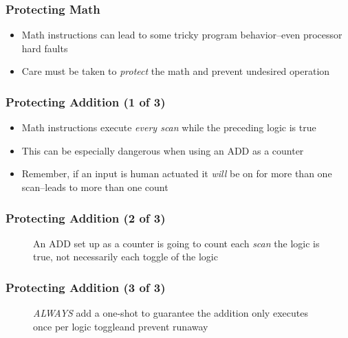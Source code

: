 \begin{frame}
    \frametitle{Protecting Math}

    \begin{itemize}
        \item Math instructions can lead to some tricky program behavior--even processor hard faults
        \item Care must be taken to \emph{protect} the math and prevent undesired operation
    \end{itemize}
\end{frame}

\begin{frame}
    \frametitle{Protecting Addition (1 of 3)}

    \begin{itemize}
        \item Math instructions execute \emph{every scan} while the preceding logic is true
        \item This can be especially dangerous when using an ADD as a counter
        \item Remember, if an input is human actuated it \emph{will} be on for more than one scan--leads to more than one count
    \end{itemize}
\end{frame}

\begin{frame}
    \frametitle{Protecting Addition (2 of 3)}

    \begin{figure}
        \centering
        \resizebox{0.625\linewidth}{!}{
            
        }

        \resizebox{0.625\linewidth}{!}{
            
        }

        \vspace{0.5em}
        {\footnotesize An ADD set up as a counter is going to count each \emph{scan} the logic is true, not necessarily each toggle of the logic\par}
    \end{figure}
\end{frame}

\begin{frame}
    \frametitle{Protecting Addition (3 of 3)}

    \begin{figure}
        \centering
        \resizebox{0.625\linewidth}{!}{
            
        }

        \resizebox{0.625\linewidth}{!}{
            
        }

        \vspace{0.5em}
        {\footnotesize \emph{ALWAYS} add a one-shot to guarantee the addition only executes once per logic toggleand prevent runaway\par}
    \end{figure}
\end{frame}

